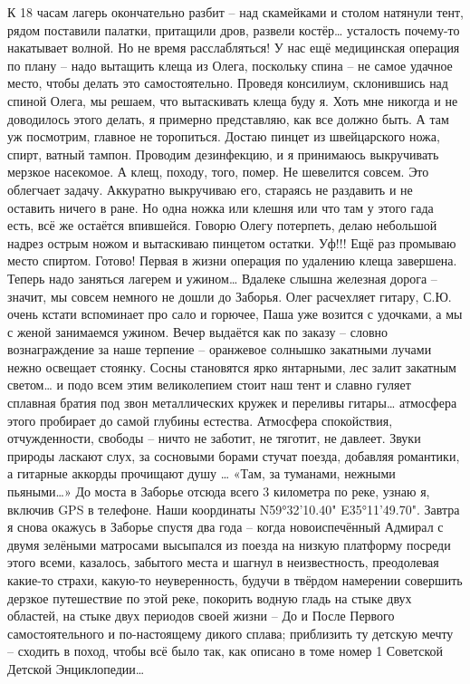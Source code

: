 К 18 часам лагерь окончательно разбит – над скамейками и столом натянули тент, рядом поставили палатки, притащили дров, развели костёр… усталость почему-то накатывает волной. Но не время расслабляться! У нас ещё медицинская операция по плану – надо вытащить клеща из Олега, поскольку спина – не самое удачное место, чтобы делать это самостоятельно. Проведя консилиум, склонившись над спиной Олега, мы решаем, что вытаскивать клеща буду я. Хоть мне никогда и не доводилось этого делать, я примерно представляю, как все должно быть. А там уж посмотрим, главное не торопиться. Достаю пинцет из швейцарского ножа, спирт, ватный тампон. Проводим дезинфекцию, и я принимаюсь выкручивать мерзкое насекомое. А клещ, походу, того, помер. Не шевелится совсем. Это облегчает задачу. Аккуратно выкручиваю его, стараясь не раздавить и не оставить ничего в ране. Но одна ножка или клешня или что там у этого гада есть, всё же остаётся впившейся. Говорю Олегу потерпеть, делаю небольшой надрез острым ножом и вытаскиваю пинцетом остатки. Уф!!! Ещё раз промываю место спиртом. Готово! Первая в жизни операция по удалению клеща завершена. Теперь надо заняться лагерем и ужином…
Вдалеке слышна железная дорога – значит, мы совсем немного не дошли до Заборья. Олег расчехляет гитару, С.Ю. очень кстати вспоминает про сало и горючее, Паша уже возится с удочками, а мы с женой занимаемся ужином. Вечер выдаётся как по заказу – словно вознаграждение за наше терпение – оранжевое солнышко закатными лучами нежно освещает стоянку. Сосны становятся ярко янтарными, лес залит закатным светом… и подо всем этим великолепием стоит наш тент и славно гуляет сплавная братия под звон металлических кружек и переливы гитары… атмосфера этого пробирает до самой глубины естества. Атмосфера спокойствия, отчужденности, свободы – ничто не заботит, не тяготит, не давлеет. Звуки природы ласкают слух, за сосновыми борами стучат поезда, добавляя романтики, а гитарные аккорды прочищают душу … «Там, за туманами, нежными пьяными…»
До моста в Заборье отсюда всего 3 километра по реке, узнаю я, включив GPS в телефоне. Наши координаты N59°32'10.40" E35°11'49.70". Завтра я снова окажусь в Заборье спустя два года – когда новоиспечённый Адмирал с двумя зелёными матросами высыпался из поезда на низкую платформу посреди этого всеми, казалось, забытого места и шагнул в неизвестность, преодолевая какие-то страхи, какую-то неуверенность, будучи в твёрдом намерении совершить дерзкое путешествие по этой реке, покорить водную гладь на стыке двух областей, на стыке двух периодов своей жизни – До и После Первого самостоятельного и по-настоящему дикого сплава; приблизить ту детскую мечту – сходить в поход, чтобы всё было так, как описано в томе номер 1 Советской Детской Энциклопедии… 
